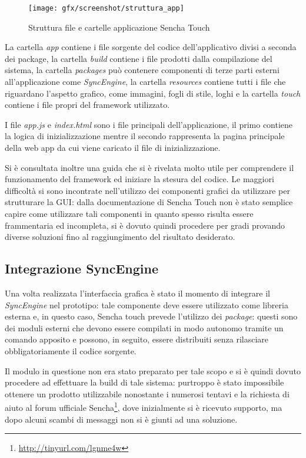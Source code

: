 \begin{figure}[htb]
\centering
\texttt{[image: gfx/screenshot/struttura\_app]}
\caption{Struttura file e cartelle applicazione Sencha Touch}
\label{fig:struttura app sencha touch}
\end{figure}

La cartella \emph{app} contiene i file sorgente del codice dell'applicativo divisi a seconda dei package, la cartella \emph{build} contiene i file prodotti dalla compilazione del sistema, la cartella \emph{packages} può contenere componenti di terze parti esterni all'applicazione come \emph{SyncEngine}, la cartella \emph{resources} contiene tutti i file che riguardano l'aspetto grafico, come immagini, fogli di stile, loghi e la cartella \emph{touch} contiene i file propri del framework utilizzato.

I file \emph{app.js} e \emph{index.html} sono i file principali dell'applicazione, il primo contiene la logica di inizializzazione mentre il secondo rappresenta la pagina principale della web app da cui viene caricato il file di inizializzazione.

Si è consultata inoltre una guida \cite{miamicoder:howto} che si è rivelata molto utile per comprendere il funzionamento del framework ed iniziare la stesura del codice.
Le maggiori difficoltà si sono incontrate nell'utilizzo dei componenti grafici da utilizzare per strutturare la \ac{GUI}: dalla documentazione di Sencha Touch non è stato semplice capire come utilizzare tali componenti in quanto spesso risulta essere frammentaria ed incompleta, si è dovuto quindi procedere per gradi provando diverse soluzioni fino al raggiungimento del risultato desiderato.

\subsection{Integrazione SyncEngine}
Una volta realizzata l'interfaccia grafica è stato il momento di integrare il \emph{SyncEngine} nel prototipo: tale componente deve essere utilizzato come libreria esterna e, in questo caso, Sencha touch prevede l'utilizzo dei \emph{package}: questi sono dei moduli esterni che devono essere compilati in modo autonomo tramite un comando apposito e possono, in seguito, essere distribuiti senza rilasciare obbligatoriamente il codice sorgente.

Il modulo in questione non era stato preparato per tale scopo e si è quindi dovuto procedere ad effettuare la build di tale sistema: purtroppo è stato impossibile ottenere un prodotto utilizzabile nonostante i numerosi tentavi e la richiesta di aiuto al forum ufficiale Sencha\footnote{\url{http://tinyurl.com/lgnme4w}}, dove inizialmente si è ricevuto supporto, ma dopo alcuni scambi di messaggi non si è giunti ad una soluzione.

